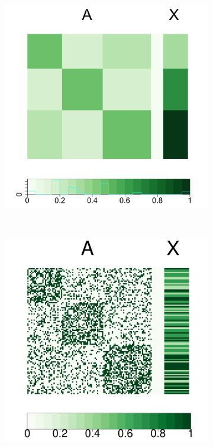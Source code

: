 \documentclass[12pt]{article}
\theoremstyle{definition}
\begin{document}
\begin{figure}[H]
	\centering
	\begin{subfigure}[b]{0.23\textwidth}
		\includegraphics[width=\textwidth]{../Figure/pmat.pdf}
		\caption{}
		\label{fig:a}
	\end{subfigure}
	~ %
	\begin{subfigure}[b]{0.23\textwidth}
		\includegraphics[width=\textwidth]{../Figure/Amat.pdf}

\end{subfigure}
\end{figure}
\end{document}
